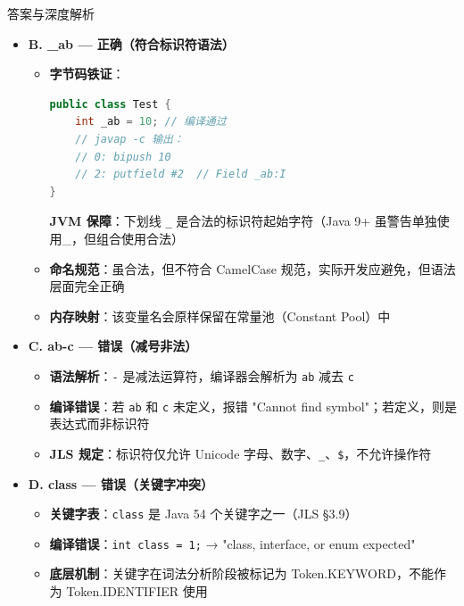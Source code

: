 \documentclass[12pt, a4paper]{ctexart}
\newcommand{\code}[1]{\texttt{#1}}
\begin{document}
\begin{enumerate}[label=\textbf{\arabic*.}, leftmargin=*, itemsep=1.5em]
\begin{bluebox}{答案与深度解析}
\begin{itemize}[leftmargin=*, nosep]
			      \item \textbf{B. \_ab — 正确（符合标识符语法）}
			            \begin{itemize}[leftmargin=*, nosep]
				            \item \textbf{字节码铁证}：
				                  \begin{lstlisting}[language=Java]
public class Test {
    int _ab = 10; // 编译通过
    // javap -c 输出：
    // 0: bipush 10
    // 2: putfield #2  // Field _ab:I
}
        \end{lstlisting}
				                  \textbf{JVM 保障}：下划线 \code{\_} 是合法的标识符起始字符（Java 9+ 虽警告单独使用\_，但组合使用合法）
				            \item \textbf{命名规范}：虽合法，但不符合 CamelCase 规范，实际开发应避免，但语法层面完全正确
				            \item \textbf{内存映射}：该变量名会原样保留在常量池（Constant Pool）中
			            \end{itemize}

			      \item \textbf{C. ab-c — 错误（减号非法）}
			            \begin{itemize}[leftmargin=*, nosep]
				            \item \textbf{语法解析}：\code{-} 是减法运算符，编译器会解析为 \code{ab} 减去 \code{c}
				            \item \textbf{编译错误}：若 \code{ab} 和 \code{c} 未定义，报错 "Cannot find symbol"；若定义，则是表达式而非标识符
				            \item \textbf{JLS 规定}：标识符仅允许 Unicode 字母、数字、\code{\_}、\code{\$}，不允许操作符
			            \end{itemize}

			      \item \textbf{D. class — 错误（关键字冲突）}
			            \begin{itemize}[leftmargin=*, nosep]
				            \item \textbf{关键字表}：\code{class} 是 Java 54 个关键字之一（JLS §3.9）
				            \item \textbf{编译错误}：\code{int class = 1;} → "class, interface, or enum expected"
				            \item \textbf{底层机制}：关键字在词法分析阶段被标记为 Token.KEYWORD，不能作为 Token.IDENTIFIER 使用
			            \end{itemize}
		      \end{itemize}


\end{bluebox}
\end{enumerate}
\end{document}
